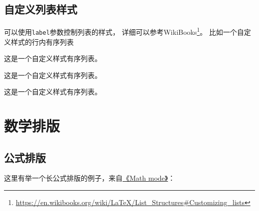 


\subsection{自定义列表样式}

可以使用\verb+label+参数控制列表的样式，
详细可以参考WikiBooks\footnote{\url{https://en.wikibooks.org/wiki/LaTeX/List_Structures\#Customizing_lists}}。
比如一个自定义样式的行内有序列表
\begin{enumerate*}[label=\itshape\alph*)\upshape]
  \item 这是一个自定义样式有序列表。
  \item 这是一个自定义样式有序列表。
  \item 这是一个自定义样式有序列表。
\end{enumerate*}

\section{数学排版}
\label{sec:matheq}

\subsection{公式排版}
\label{sec:eqformat}

这里有举一个长公式排版的例子，来自\href{http://www.tex.ac.uk/tex-archive/info/math/voss/mathmode/Mathmode.pdf}{《Math mode》}：

